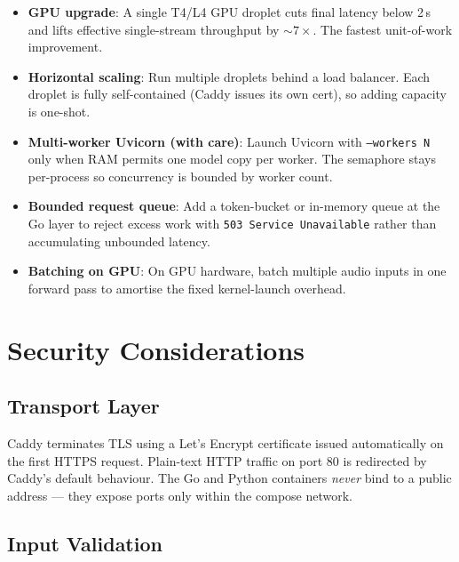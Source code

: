 \begin{goldbox}[title=Recommended Scalability Enhancements]
\begin{itemize}
  \item \textbf{GPU upgrade}: A single T4/L4 GPU droplet cuts final latency below 2\,s and lifts effective single-stream throughput by ${\sim}7\times$. The fastest unit-of-work improvement.
  \item \textbf{Horizontal scaling}: Run multiple droplets behind a load balancer. Each droplet is fully self-contained (Caddy issues its own cert), so adding capacity is one-shot.
  \item \textbf{Multi-worker Uvicorn (with care)}: Launch Uvicorn with \texttt{--workers N} only when RAM permits one model copy per worker. The semaphore stays per-process so concurrency is bounded by worker count.
  \item \textbf{Bounded request queue}: Add a token-bucket or in-memory queue at the Go layer to reject excess work with \texttt{503 Service Unavailable} rather than accumulating unbounded latency.
  \item \textbf{Batching on GPU}: On GPU hardware, batch multiple audio inputs in one forward pass to amortise the fixed kernel-launch overhead.
\end{itemize}
\end{goldbox}

\chapter{Security Considerations}

\section{Transport Layer}

Caddy terminates TLS using a Let's Encrypt certificate issued automatically on the first HTTPS request. Plain-text HTTP traffic on port 80 is redirected by Caddy's default behaviour. The Go and Python containers \emph{never} bind to a public address --- they expose ports only within the compose network.

\section{Input Validation}

